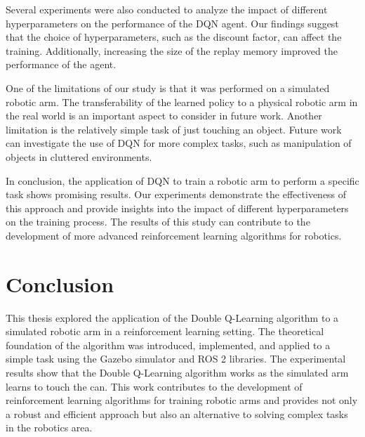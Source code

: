 \documentclass[12pt,oneside]{article}
\begin{document}
Several experiments were also conducted to analyze the impact of different hyperparameters on the performance of the DQN agent. Our findings suggest that the choice of hyperparameters, such as the discount factor, can affect the training. Additionally, increasing the size of the replay memory  improved the performance of the agent.

One of the limitations of our study is that it was performed on a simulated robotic arm. The transferability of the learned policy to a physical robotic arm in the real world is an important aspect to consider in future work. Another limitation is the relatively simple task of just touching an object. Future work can investigate the use of DQN for more complex tasks, such as manipulation of objects in cluttered environments.

In conclusion, the application of DQN to train a robotic arm to perform a specific task shows promising results. Our experiments demonstrate the effectiveness of this approach and provide insights into the impact of different hyperparameters on the training process. The results of this study can contribute to the development of more advanced reinforcement learning algorithms for robotics.


%
\section{Conclusion}
This thesis explored the application of the Double Q-Learning algorithm to a simulated robotic arm in a reinforcement learning setting. The theoretical foundation of the algorithm was introduced, implemented, and applied to a simple task using the Gazebo simulator and ROS 2 libraries. The experimental results show that the Double Q-Learning algorithm works as the simulated arm learns to touch the can. This work contributes to the development of reinforcement learning algorithms for training robotic arms and provides not only a robust and efficient approach but also an alternative to solving complex tasks in the robotics area.
\end{document}
